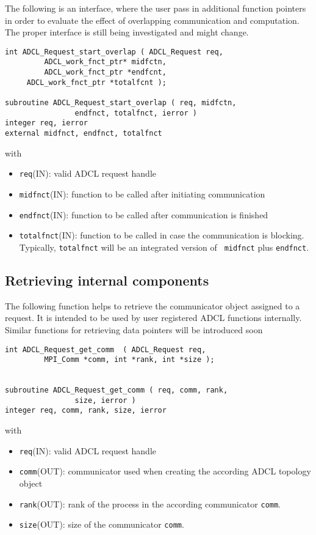The following is an interface, where the user pass in additional function
pointers in order to evaluate the effect of overlapping communication and
computation. The proper interface is still being investigated and might
change.

\begin{verbatim}
int ADCL_Request_start_overlap ( ADCL_Request req, 
         ADCL_work_fnct_ptr* midfctn,
         ADCL_work_fnct_ptr *endfcnt, 
	 ADCL_work_fnct_ptr *totalfcnt );

subroutine ADCL_Request_start_overlap ( req, midfctn,
                endfnct, totalfnct, ierror )
integer req, ierror
external midfnct, endfnct, totalfnct
\end{verbatim}
with
\begin{itemize}
\item {\tt req}(IN): valid ADCL request handle
\item {\tt midfnct}(IN): function to be called after initiating communication
\item {\tt endfnct}(IN): function to be called after communication is finished
\item {\tt totalfnct}(IN): function to be called in case the communication is
  blocking. Typically, {\tt totalfnct} will be an integrated version of {\tt
    midfnct} plus {\tt endfnct}.
\end{itemize}
\hspace{1cm}

\subsection{Retrieving internal components}

The following function helps to retrieve the communicator object assigned to a
request. It is intended to be used by user registered ADCL functions
internally. Similar functions for retrieving data pointers will be introduced
soon

\begin{verbatim}
int ADCL_Request_get_comm  ( ADCL_Request req, 
         MPI_Comm *comm, int *rank, int *size );


subroutine ADCL_Request_get_comm ( req, comm, rank,
                size, ierror )
integer req, comm, rank, size, ierror     
\end{verbatim}
with
\begin{itemize}
\item {\tt req}(IN): valid ADCL request handle
\item {\tt comm}(OUT): communicator used when creating the according ADCL topology object
\item {\tt rank}(OUT): rank of the process in the according communicator {\tt comm}.
\item {\tt size}(OUT): size of the communicator {\tt comm}.
\end{itemize}
\hspace{1cm}

